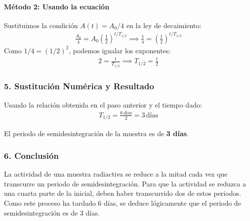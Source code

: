 \paragraph{Método 2: Usando la ecuación}
Sustituimos la condición $A(t) = A_0/4$ en la ley de decaimiento:
\begin{gather}
    \frac{A_0}{4} = A_0 \left(\frac{1}{2}\right)^{t/T_{1/2}} \implies \frac{1}{4} = \left(\frac{1}{2}\right)^{t/T_{1/2}}
\end{gather}
Como $1/4 = (1/2)^2$, podemos igualar los exponentes:
\begin{gather}
    2 = \frac{t}{T_{1/2}} \implies T_{1/2} = \frac{t}{2}
\end{gather}

\subsubsection*{5. Sustitución Numérica y Resultado}
Usando la relación obtenida en el paso anterior y el tiempo dado:
\begin{gather}
    T_{1/2} = \frac{6 \, \text{días}}{2} = 3 \, \text{días}
\end{gather}
\begin{cajaresultado}
El periodo de semidesintegración de la muestra es de \textbf{3 días}.
\end{cajaresultado}

\subsubsection*{6. Conclusión}
\begin{cajaconclusion}
La actividad de una muestra radiactiva se reduce a la mitad cada vez que transcurre un periodo de semidesintegración. Para que la actividad se reduzca a una cuarta parte de la inicial, deben haber transcurrido dos de estos periodos. Como este proceso ha tardado 6 días, se deduce lógicamente que el periodo de semidesintegración es de 3 días.
\end{cajaconclusion}

\newpage